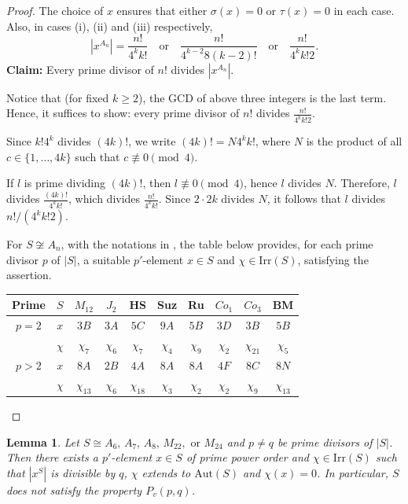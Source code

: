 \documentclass[11pt, a4paper]{article}
\numberwithin{equation}{section}
\theoremstyle{plain} %
\newtheorem{lemma}[theorem]{Lemma}
\begin{document}
\begin{proof}
The choice of $x$ ensures that either $\sigma(x)=0$ or $\tau(x)=0$ in each case. Also, in cases (i), (ii) and (iii) respectively, 
$$
|x^{A_n}|=\frac{n!}{4^k k!}
\quad \text{or} \quad
\frac{n!}{4^{k-2}8(k-2)!}
\quad \text{or} \quad
\frac{n!}{4^k k!2}.
$$
\textbf{Claim:} Every prime divisor of $n!$ divides $|x^{A_n}|$.

Notice that (for fixed $k\ge 2$), the GCD of above three integers is the last term. Hence, it suffices to show: every prime divisor of $n!$ divides $\frac{n!}{4^kk!2}$. 



Since $k!4^k$ divides $(4k)!$, we write $(4k)!=N4^kk!$, where $N$ is the product of all $c\in \{1,\ldots, 4k\}$ such that $c\not\equiv 0\pmod{4}$. 

If $l$ is prime dividing $(4k)!$, then $l\not\equiv 0\pmod{4}$, hence $l$ divides $N$. Therefore, $l$ divides $\frac{(4k)!}{4^k k!}$, which divides $\frac{n!}{4^k k!}$. Since $2\cdot 2k$ divides $N$, it follows that $l$ divides $n!/(4^k k! 2)$. 

\vskip5mm
For $S\not\cong A_n$, with the notations in \cite{MR827219}, the table below provides, for each prime divisor $p$ of $|S|$, a suitable $p'$-element $x\in S$ and $\chi\in \mathrm{Irr}(S)$, satisfying the assertion.
\begin{center}
\begin{tabular}{|c|c|c|c|c|c|c|c|c|c| } 
\hline
Prime & $S$ &  $M_{12}$ & $J_2$ & HS & Suz & Ru & $Co_1$ & $Co_3$ & BM \\\hline
$p=2$ & $x$  & $3B$  &  $3A$ & $5C$ & $9A$ & $5B$ & $3D$ & $3B$ & $5B$ \\
 & $\chi$  & $\chi_7$   & $\chi_6$ & $\chi_7$ & $\chi_4$ & $\chi_9$ & $\chi_2$ & $\chi_{21}$ & $\chi_5$ \\\hline 
$p>2$ &  $x$  & $8A$ & $2B$ & $4A$ & $8A$ & $8A$ & $4F$ & $8C$ & $8N$ \\
& $\chi$  & $\chi_{13}$ & $\chi_6$ & $\chi_{18}$ & $\chi_3$ & $\chi_2$ & $\chi_{2}$ & $\chi_{9}$ & $\chi_{13}$ \\\hline
\end{tabular}
\end{center}

\end{proof}

\begin{lemma}\label{cor2}
  Let $S\cong A_6,\, A_7,\, A_8,\, M_{22}, \text{ or }M_{24}$ and $p\neq q$ be prime divisors of $|S|$. Then there exists a $p'$-element $x\in S$ of prime power order and $\chi\in \mathrm{Irr}(S) $ such that $|x^S|$ is divisible by $q$, $\chi$ extends to $\mathrm{Aut}(S)$ and $\chi(x)=0$. In particular, $S$ does not satisfy the property $P_v(p,q)$. 
\end{lemma}
\end{document}
